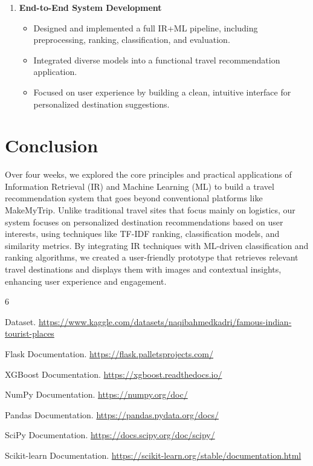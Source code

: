 \documentclass[12pt,a4paper]{article}
\begin{document}
\begin{enumerate}
    \item \textbf{End-to-End System Development}
    \begin{itemize}
        \item Designed and implemented a full IR+ML pipeline, including preprocessing, ranking, classification, and evaluation.
        \item Integrated diverse models into a functional travel recommendation application.
        \item Focused on user experience by building a clean, intuitive interface for personalized destination suggestions.
    \end{itemize}
\end{enumerate}

\newpage
\section{Conclusion}
Over four weeks, we explored the core principles and practical applications of Information Retrieval (IR) and Machine Learning (ML) to build a travel recommendation system that goes beyond conventional platforms like MakeMyTrip. Unlike traditional travel sites that focus mainly on logistics, our system focuses on personalized destination recommendations based on user interests, using techniques like TF-IDF ranking, classification models, and similarity metrics. By integrating IR techniques with ML-driven classification and ranking algorithms, we created a user-friendly prototype that retrieves relevant travel destinations and displays them with images and contextual insights, enhancing user experience and engagement.

\newpage
\begin{thebibliography}{6}

Dataset. \url{https://www.kaggle.com/datasets/naqibahmedkadri/famous-indian-tourist-places}

Flask Documentation. \url{https://flask.palletsprojects.com/}

XGBoost Documentation. \url{https://xgboost.readthedocs.io/}

NumPy Documentation. \url{https://numpy.org/doc/}

Pandas Documentation. \url{https://pandas.pydata.org/docs/}

SciPy Documentation. \url{https://docs.scipy.org/doc/scipy/}

Scikit-learn Documentation. \url{https://scikit-learn.org/stable/documentation.html}

\end{thebibliography}
\end{document}
